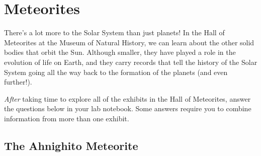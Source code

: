 \documentclass[12pt]{article}
\begin{document}
\section{Meteorites}

There's a lot more to the Solar System than just planets! In the Hall of
Meteorites at the Museum of Natural History, we can learn about the other solid
bodies that orbit the Sun. Although smaller, they have played a role in the
evolution of life on Earth, and they carry records that tell the history of the
Solar System going all the way back to the formation of the planets (and even
further!).  


\emph{After} taking time to explore all of the exhibits in the 
Hall of Meteorites, answer the questions below in your lab notebook. Some answers require 
you to combine information from more than one exhibit. 


\subsection{The Ahnighito Meteorite}
\end{document}
